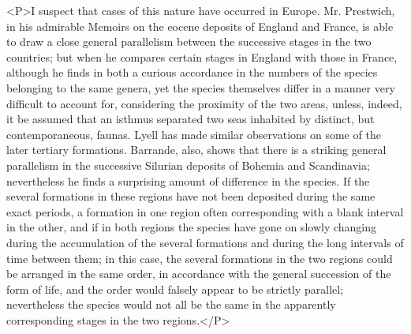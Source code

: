 <P>I suspect that cases of this nature have occurred in Europe. Mr. Prestwich, in his admirable Memoirs on the eocene deposits of England and France, is able to draw a close general parallelism between the successive stages in the two countries; but when he compares certain stages in England with those in France, although he finds in both a curious accordance in the numbers of the species belonging to the same genera, yet the species themselves differ in a manner very difficult to account for, considering the proximity of the two areas, unless, indeed, it be assumed that an isthmus separated two seas inhabited by distinct, but contemporaneous, faunas. Lyell has made similar observations on some of the later tertiary formations.  Barrande, also, shows that there is a striking general parallelism in the successive Silurian deposits of Bohemia and Scandinavia; nevertheless he finds a surprising amount of difference in the species. If the several formations in these regions have not been deposited during the same exact periods, a formation in one region often corresponding with a blank interval in the other, and if in both regions the species have gone on slowly changing during the accumulation of the several formations and during the long intervals of time between them; in this case, the several formations in the two regions could be arranged in the same order, in accordance with the general succession of the form of life, and the order would falsely appear to be strictly parallel; nevertheless the species would not all be the same in the apparently corresponding stages in the two regions.</P>

